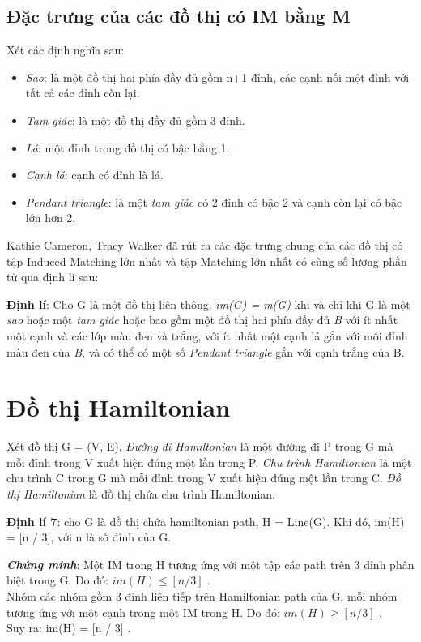 \documentclass[14pt,a4paper]{extreport}
\begin{document}
\section{Đặc trưng của các đồ thị có IM bằng M}
Xét các định nghĩa sau:
\begin{itemize}
	\item \textit{Sao}: là một đồ thị hai phía đầy đủ gồm n+1 đỉnh, các cạnh nối một đỉnh với tất cả các đỉnh còn lại.
	\item \textit{Tam giác}: là một đồ thị đầy đủ gồm 3 đỉnh.  
	\item \textit{Lá}: một đỉnh trong đồ thị có bậc bằng 1.
	\item \textit{Cạnh lá}: cạnh có đỉnh là lá.
	\item \textit{Pendant triangle}: là một \textit{tam giác} có 2 đỉnh có bậc 2 và cạnh còn lại có bậc lớn hơn 2.
\end{itemize}
Kathie Cameron, Tracy Walker đã rút ra các đặc trưng chung của các đồ thị có tập Induced Matching lớn nhất và tập Matching lớn nhất có cùng số lượng phần tử qua định lí sau:

\textbf{Định lí}: Cho G là một đồ thị liên thông. \textit{im(G) = m(G)} khi và chỉ khi G là một \textit{sao} hoặc một \textit{tam giác} hoặc bao gồm một đồ thị hai phía đầy đủ \textit{B} với ít nhất một cạnh và các lớp màu đen và trắng, với ít nhất một cạnh lá gắn với mỗi đỉnh màu đen của \textit{B}, và có thể có một số \textit{Pendant triangle} gắn với cạnh trắng của B.

\chapter{Đồ thị Hamiltonian}

Xét đồ thị G = (V, E). \textit{Đường đi Hamiltonian} là một đường đi P trong G mà mỗi đỉnh trong V xuất hiện đúng một lần trong P.\textit{ Chu trình Hamiltonian} là một chu trình C trong G mà mỗi đỉnh trong V xuất hiện đúng một lần trong C. \textit{Đồ thị Hamiltonian} là đồ thị chứa chu trình Hamiltonian.

\textbf{Định lí 7}: cho G là đồ thị chứa hamiltonian path, H = Line(G). Khi đó, im(H) = [n / 3], với n là số đỉnh của G.

\textbf{\textit{Chứng minh}}:
Một IM trong H tương ứng với một tập các path trên 3 đỉnh phân biệt trong G. Do đó: $ im(H) \leq [n / 3] $ .\\
Nhóm các nhóm gồm 3 đỉnh liên tiếp trên Hamiltonian path của G, mỗi nhóm tương ứng với một cạnh trong một IM trong H. 
Do đó: $ im(H) \geq [n / 3] $ .\\
 Suy ra: im(H) = [n / 3] .
\end{document}
